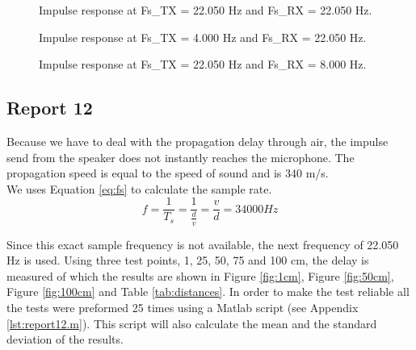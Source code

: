 \documentclass[final]{scrreprt} %
\begin{document}
\begin{figure}[H]
	\centering
	\setlength\figureheight{4cm}
    	\setlength{}
	
	\caption{Impulse response at Fs\_TX = 22.050 Hz and Fs\_RX = 22.050 Hz.}
	\label{fig:response_1}
\end{figure}

\begin{figure}[H]
	\centering
	\setlength\figureheight{4cm}
    	\setlength{}
	
	\caption{Impulse response at Fs\_TX = 4.000 Hz and Fs\_RX = 22.050 Hz.}
	\label{fig:response_2}
\end{figure}

\begin{figure}[H]
	\centering
	\setlength\figureheight{4cm}
    	\setlength{}
	
	\caption{Impulse response at Fs\_TX = 22.050 Hz and Fs\_RX = 8.000 Hz.}
	\label{fig:response_3}
\end{figure}

%	

\subsection{Report 12}
Because we have to deal with the propagation delay through air, the impulse send from the speaker does not instantly reaches the microphone. 
The propagation speed is equal to the speed of sound and is 340 m/s.\\
We uses Equation \ref{eq:fs} to calculate the sample rate. 
\begin{equation}
f= \frac{1}{T_{s}}=\frac{1}{\frac{d}{v}}=\frac{v}{d}=34000 Hz
\label{eq:fs}
\end{equation}

Since this exact sample frequency is not available, the next frequency of 22.050 Hz is used.
Using three test points, 1, 25, 50, 75 and 100 cm, the delay is measured of which the results are shown in Figure \ref{fig:1cm}, Figure \ref{fig:50cm}, Figure \ref{fig:100cm} and Table \ref{tab:distances}.
In order to make the test reliable all the tests were preformed 25 times using a Matlab script (see Appendix \ref{lst:report12.m}).
This script will also calculate the mean and the standard deviation of the results.
\end{document}
